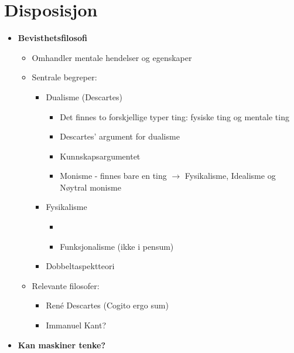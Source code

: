 \section*{Disposisjon}
\begin{itemize}
    \item \textbf{Bevisthetsfilosofi}
          \begin{itemize}
              \item Omhandler mentale hendelser og egenskaper
              \item Sentrale begreper:
                    \begin{itemize}
                        \item Dualisme (Descartes)
                              \begin{itemize}
                                  \item Det finnes to forskjellige typer ting: fysiske ting og mentale ting
                                  \item Descartes' argument for dualisme
                                  \item Kunnskapsargumentet
                                  \item Monisme - finnes bare en ting \(\rightarrow\) Fysikalisme, Idealisme og Nøytral monisme
                              \end{itemize}
                        \item Fysikalisme
                              \begin{itemize}
                                  \item
                                  \item Funksjonalisme (ikke i pensum)
                              \end{itemize}
                        \item Dobbeltaspektteori
                    \end{itemize}
              \item Relevante filosofer:
                    \begin{itemize}
                        \item René Descartes (Cogito ergo sum)
                        \item Immanuel Kant?
                    \end{itemize}
          \end{itemize}
    \item \textbf{Kan maskiner tenke?}

\end{itemize}
